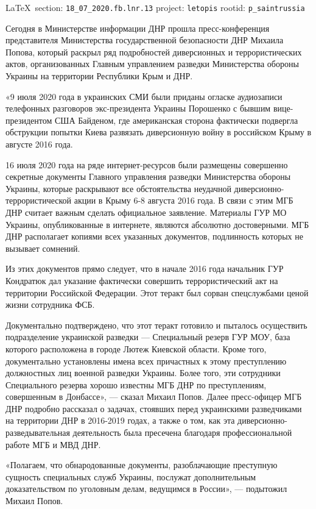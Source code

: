 \documentclass[a4paper,11pt]{extreport}
\begin{document}
\vspace{0.5cm}
{\small\LaTeX~section: \verb|18_07_2020.fb.lnr.13| project: \verb|letopis| rootid: \verb|p_saintrussia|}
\vspace{0.5cm}

Сегодня в Министерстве информации ДНР прошла пресс-конференция представителя
Министерства государственной безопасности ДНР Михаила Попова, который раскрыл
ряд подробностей диверсионных и террористических актов, организованных Главным
управлением разведки Министерства обороны Украины на территории Республики Крым
и ДНР.

«9 июля 2020 года в украинских СМИ были приданы огласке аудиозаписи телефонных
разговоров экс-президента Украины Порошенко с бывшим вице-президентом США
Байденом, где американская сторона фактически подвергла обструкции попытки
Киева развязать диверсионную войну в российском Крыму в августе 2016 года.

16 июля 2020 года на ряде интернет-ресурсов были размещены совершенно секретные
документы Главного управления разведки Министерства обороны Украины, которые
раскрывают все обстоятельства неудачной диверсионно-террористической акции в
Крыму 6-8 августа 2016 года.  В связи с этим МГБ ДНР считает важным сделать
официальное заявление.  Материалы ГУР МО Украины, опубликованные в интернете,
являются абсолютно достоверными. МГБ ДНР располагает копиями всех указанных
документов, подлинность которых не вызывает сомнений.

Из этих документов прямо следует, что в начале 2016 года начальник ГУР
Кондратюк дал указание фактически совершить террористический акт на территории
Российской Федерации. Этот теракт был сорван спецслужбами ценой жизни
сотрудника ФСБ.

Документально подтверждено, что этот теракт готовило и пыталось осуществить
подразделение украинской разведки --- Специальный резерв ГУР МОУ, база которого
расположена в городе Лютеж Киевской области.  Кроме того, документально
установлены имена всех причастных к этому преступлению должностных лиц военной
разведки Украины. Более того, эти сотрудники Специального резерва хорошо
известны МГБ ДНР по преступлениям, совершенным в Донбассе», --- сказал Михаил
Попов.  Далее пресс-офицер МГБ ДНР подробно рассказал о задачах, стоявших перед
украинскими разведчиками на территории ДНР в 2016-2019 годах, а также о том,
как эта диверсионно-разведывательная деятельность была пресечена благодаря
профессиональной работе МГБ и МВД ДНР.

«Полагаем, что обнародованные документы, разоблачающие преступную сущность
специальных служб Украины, послужат дополнительным доказательством по уголовным
делам, ведущимся в России», --- подытожил Михаил Попов.
\end{document}
